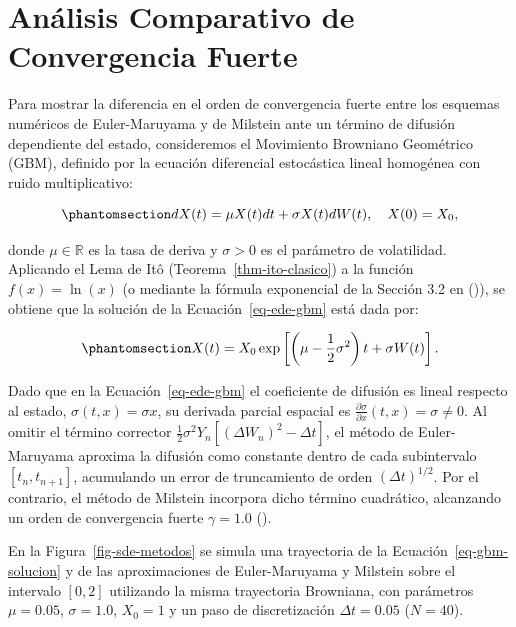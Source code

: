\documentclass[
  spanish,
  us-letterpaper,
]{scrreprt}
\numberwithin{equation}{section}
\theoremstyle{plain}
\theoremstyle{plain}
\theoremstyle{plain}
\theoremstyle{definition}
\theoremstyle{remark}
\begin{document}
\section{Análisis Comparativo de Convergencia
Fuerte}\label{anuxe1lisis-comparativo-de-convergencia-fuerte}

Para mostrar la diferencia en el orden de convergencia fuerte entre los
esquemas numéricos de Euler-Maruyama y de Milstein ante un término de
difusión dependiente del estado, consideremos el Movimiento Browniano
Geométrico (GBM), definido por la ecuación diferencial estocástica
lineal homogénea con ruido multiplicativo:

\begin{equation}\phantomsection\label{eq-ede-gbm}{
dX(t) = \mu X(t) dt + \sigma X(t) dW(t), \quad X(0) = X_0,
}\end{equation}

donde \(\mu \in \mathbb{R}\) es la tasa de deriva y \(\sigma > 0\) es el
parámetro de volatilidad. Aplicando el Lema de Itô
(Teorema~\ref{thm-ito-clasico}) a la función \(f(x) = \ln(x)\) (o
mediante la fórmula exponencial de la Sección 3.2 en
()), se obtiene que la solución
de la Ecuación~\ref{eq-ede-gbm} está dada por:

\begin{equation}\phantomsection\label{eq-gbm-solucion}{
X(t) = X_0 \exp\left[ \left( \mu - \frac{1}{2}\sigma^2 \right)t + \sigma W(t) \right].
}\end{equation}

Dado que en la Ecuación~\ref{eq-ede-gbm} el coeficiente de difusión es
lineal respecto al estado, \(\sigma(t, x) = \sigma x\), su derivada
parcial espacial es
\(\displaystyle \frac{\partial \sigma}{\partial x}(t, x) = \sigma \neq 0\).
Al omitir el término corrector
\(\frac{1}{2}\sigma^2 Y_n [(\Delta W_n)^2 - \Delta t]\), el método de
Euler-Maruyama aproxima la difusión como constante dentro de cada
subintervalo \([t_n, t_{n+1}]\), acumulando un error de truncamiento de
orden \((\Delta t)^{1/2}\). Por el contrario, el método de Milstein
incorpora dicho término cuadrático, alcanzando un orden de convergencia
fuerte \(\gamma = 1.0\) ().

En la Figura~\ref{fig-sde-metodos} se simula una trayectoria de la
Ecuación~\ref{eq-gbm-solucion} y de las aproximaciones de Euler-Maruyama
y Milstein sobre el intervalo \([0, 2]\) utilizando la misma trayectoria
Browniana, con parámetros \(\mu = 0.05\), \(\sigma = 1.0\), \(X_0 = 1\)
y un paso de discretización \(\Delta t = 0.05\) (\(N = 40\)).
\end{document}
